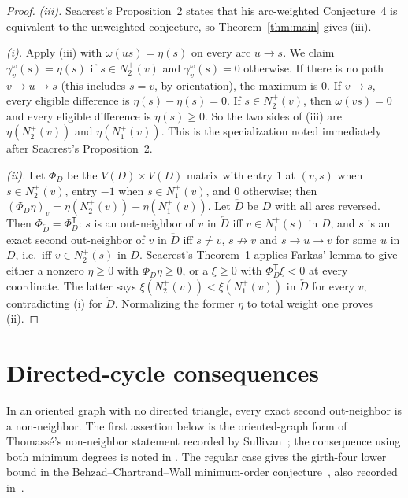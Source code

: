 \documentclass[11pt]{article}
\theoremstyle{remark}
\newcommand{\tr}{\mathsf T}
\begin{document}
\begin{proof}
\emph{(iii).} Seacrest's Proposition~2 states that his arc-weighted
Conjecture~4 is equivalent to the unweighted conjecture, so
Theorem~\ref{thm:main} gives \textup{(iii)}.

\emph{(i).} Apply \textup{(iii)} with $\omega(us)=\eta(s)$ on every arc
$u\to s$. We claim $\gamma_v^\omega(s)=\eta(s)$ if $s\in N_2^+(v)$ and
$\gamma_v^\omega(s)=0$ otherwise. If there is no path $v\to u\to s$ (this
includes $s=v$, by orientation), the maximum is $0$. If $v\to s$, every
eligible difference is $\eta(s)-\eta(s)=0$. If $s\in N_2^+(v)$, then
$\omega(vs)=0$ and every eligible difference is $\eta(s)\ge0$. So the two sides
of \textup{(iii)} are $\eta(N_2^+(v))$ and $\eta(N_1^+(v))$. This is the
specialization noted immediately after Seacrest's Proposition~2.

\emph{(ii).} Let $\Phi_D$ be the $V(D)\times V(D)$ matrix with entry $1$ at
$(v,s)$ when $s\in N_2^+(v)$, entry $-1$ when $s\in N_1^+(v)$, and $0$
otherwise; then $(\Phi_D\eta)_v=\eta(N_2^+(v))-\eta(N_1^+(v))$. Let
$\overleftarrow D$ be $D$ with all arcs reversed. Then
$\Phi_{\overleftarrow D}=\Phi_D^{\tr}$: $s$ is an out-neighbor of $v$ in
$\overleftarrow D$ iff $v\in N_1^+(s)$ in $D$, and $s$ is an exact second
out-neighbor of $v$ in $\overleftarrow D$ iff $s\ne v$, $s\not\to v$ and
$s\to u\to v$ for some $u$ in $D$, i.e.\ iff $v\in N_2^+(s)$ in $D$. Seacrest's
Theorem~1 applies Farkas' lemma to give either a nonzero $\eta\ge0$ with
$\Phi_D\eta\ge0$, or a $\xi\ge0$ with $\Phi_D^{\tr}\xi<0$ at every coordinate.
The latter says $\xi(N_2^+(v))<\xi(N_1^+(v))$ in $\overleftarrow D$ for every
$v$, contradicting \textup{(i)} for $\overleftarrow D$. Normalizing the former
$\eta$ to total weight one proves \textup{(ii)}.
\end{proof}

\section{Directed-cycle consequences}\label{sec:directed-cycle-consequences}

In an oriented graph with no directed triangle, every exact second
out-neighbor is a non-neighbor. The first assertion below is the
oriented-graph form of Thomass\'e's non-neighbor statement recorded by
Sullivan~\cite[Conjecture~6.12]{Sullivan2006}; the consequence using both
minimum degrees is noted in \cite[Section~3]{Sullivan2006}. The regular case
gives the girth-four lower bound in the Behzad--Chartrand--Wall minimum-order
conjecture~\cite{BehzadChartrandWall1970}, also recorded
in~\cite[Section~4]{Sullivan2006}.
\end{document}

